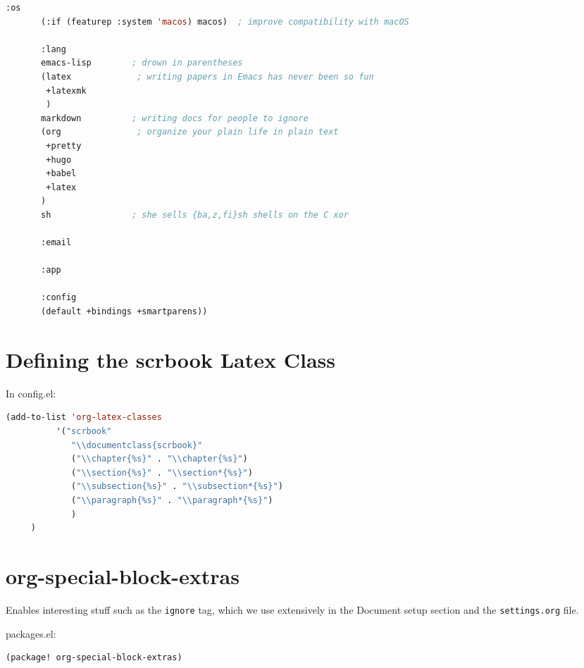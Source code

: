 \documentclass[a4paper,oneside,toc=bibliography,toc=listof]{scrbook}
\newenvironment{widemargin}{
\begin{center}
\begin{adjustwidth}{-1.5cm}{-1.5cm}
}{
\end{adjustwidth}
\end{center}
}
\begin{document}
\begin{widemargin}
\begin{lstlisting}[language=Lisp,numbers=none]
       :os
       (:if (featurep :system 'macos) macos)  ; improve compatibility with macOS

       :lang
       emacs-lisp        ; drown in parentheses
       (latex             ; writing papers in Emacs has never been so fun
        +latexmk
        )
       markdown          ; writing docs for people to ignore
       (org               ; organize your plain life in plain text
        +pretty
        +hugo
        +babel
        +latex
       )
       sh                ; she sells {ba,z,fi}sh shells on the C xor

       :email

       :app

       :config
       (default +bindings +smartparens))
\end{lstlisting}
\end{widemargin}
\section{Defining the scrbook Latex Class}
\label{sec:org3501a55}
In config.el:

\begin{lstlisting}[language=Lisp,numbers=none]
(add-to-list 'org-latex-classes
          '("scrbook"
             "\\documentclass{scrbook}"
             ("\\chapter{%s}" . "\\chapter{%s}")
             ("\\section{%s}" . "\\section*{%s}")
             ("\\subsection{%s}" . "\\subsection*{%s}")
             ("\\paragraph{%s}" . "\\paragraph*{%s}")
             )
     )
\end{lstlisting}
\section{org-special-block-extras}
\label{sec:org8a71643}
Enables interesting stuff such as the \texttt{ignore} tag, which we use extensively in the Document setup section and the \texttt{settings.org} file.

packages.el:
\begin{lstlisting}[language=Lisp,numbers=none]
(package! org-special-block-extras)
\end{lstlisting}
\end{document}

